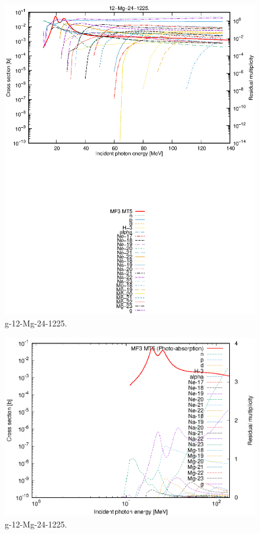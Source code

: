 \begin{figure}
 \includegraphics[width=\linewidth]{eps/g_12-Mg-24_1225.eps}
  \caption{g-12-Mg-24-1225.}
\end{figure}
\newpage \clearpage

\begin{figure}
 \includegraphics[width=\linewidth]{eps-log/g_12-Mg-24_1225.eps}
 \caption{g-12-Mg-24-1225.}
\end{figure}
\newpage \clearpage

